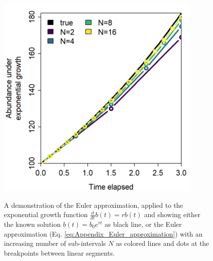 \begin{figure}[!ht]
    \caption[Demonstrating Euler approximation for exponential population growth]{A demonstration of the Euler approximation, applied to the exponential growth function \(\frac{d}{dt}b(t) = rb(t)\) and showing either the known solution \(b(t)=b_0 e^{rt}\) as black line, or the Euler approximation (Eq. \ref{eq:Appendix_Euler_approximation}) with an increasing number of sub-intervals \(N\) as colored lines and dots at the breakpoints between linear segments.}
    \centering
    \includegraphics[width=4in]{Appendix/euler_demo.png}
    \label{fig:Appendix_Euler_approximation}
\end{figure}

